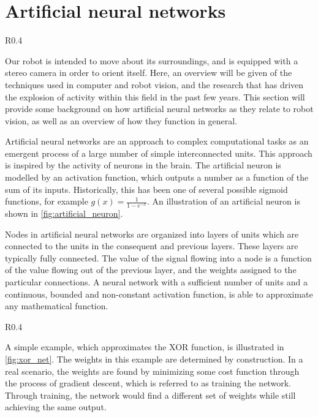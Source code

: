 \documentclass[\rootfolder/main.tex]{subfiles}
\begin{document}
\section{Artificial neural networks}

\begin{wrapfigure}{R}{0.4\columnwidth}
    \caption{Model of an artificial neuron.\label{fig:artificial_neuron}}
\end{wrapfigure}

Our robot is intended to move about its surroundings, and is equipped with a stereo camera in order to orient itself.
Here, an overview will be given of the techniques used in computer and robot vision, and the research that has driven the explosion of activity within this field in the past few years.
This section will provide some background on how artificial neural networks as they relate to robot vision, as well as an overview of how they function in general.

Artificial neural networks are an approach to complex computational tasks as an emergent process of a large number of simple interconnected units.
This approach is inspired by the activity of neurons in the brain.
The artificial neuron is modelled by an activation function, which outputs a number as a function of the sum of its inputs.
Historically, this has been one of several possible sigmoid functions, for example $g\left(x\right) = \frac{1}{1 - e^{-x}}$.
An illustration of an artificial neuron is shown in \cref{fig:artificial_neuron}.

Nodes in artificial neural networks are organized into layers of units which are connected to the units in the consequent and previous layers.
These layers are typically fully connected.
The value of the signal flowing into a node is a function of the value flowing out of the previous layer, and the weights assigned to the particular connections.
A neural network with a sufficient number of units and a continuous, bounded and non-constant activation function, is able to approximate any mathematical function\cite{Cybenko1989}\cite{Hornik1991}.

\begin{wrapfigure}{R}{0.4\columnwidth}
    \caption{XOR network, illustrating how neurons can implement basic logic functions.\label{fig:xor_net}}
\end{wrapfigure}

A simple example, which approximates the XOR function, is illustrated in \cref{fig:xor_net}.
The weights in this example are determined by construction.
In a real scenario, the weights are found by minimizing some cost function through the process of gradient descent, which is referred to as training the network\cite{Mitchell1997}.
Through training, the network would find a different set of weights while still achieving the same output.
\end{document}
